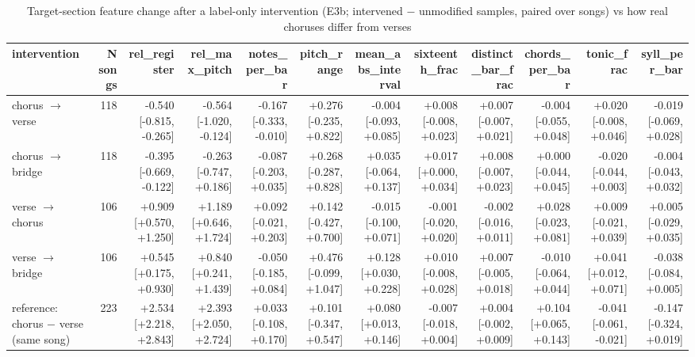 \begin{table}[t]
\centering
\small
\begin{tabular}{lrrrrrrrrrrr}
\toprule
intervention & N songs & rel\_register & rel\_max\_pitch & notes\_per\_bar & pitch\_range & mean\_abs\_interval & sixteenth\_frac & distinct\_bar\_frac & chords\_per\_bar & tonic\_frac & syll\_per\_bar \\
\midrule
chorus $\rightarrow$ verse & 118 & -0.540 [-0.815, -0.265] & -0.564 [-1.020, -0.124] & -0.167 [-0.333, -0.010] & +0.276 [-0.235, +0.822] & -0.004 [-0.093, +0.085] & +0.008 [-0.008, +0.023] & +0.007 [-0.007, +0.021] & -0.004 [-0.055, +0.048] & +0.020 [-0.008, +0.046] & -0.019 [-0.069, +0.028] \\
chorus $\rightarrow$ bridge & 118 & -0.395 [-0.669, -0.122] & -0.263 [-0.747, +0.186] & -0.087 [-0.203, +0.035] & +0.268 [-0.287, +0.828] & +0.035 [-0.064, +0.137] & +0.017 [+0.000, +0.034] & +0.008 [-0.007, +0.023] & +0.000 [-0.044, +0.045] & -0.020 [-0.044, +0.003] & -0.004 [-0.043, +0.032] \\
verse $\rightarrow$ chorus & 106 & +0.909 [+0.570, +1.250] & +1.189 [+0.646, +1.724] & +0.092 [-0.021, +0.203] & +0.142 [-0.427, +0.700] & -0.015 [-0.100, +0.071] & -0.001 [-0.020, +0.020] & -0.002 [-0.016, +0.011] & +0.028 [-0.023, +0.081] & +0.009 [-0.021, +0.039] & +0.005 [-0.029, +0.035] \\
verse $\rightarrow$ bridge & 106 & +0.545 [+0.175, +0.930] & +0.840 [+0.241, +1.439] & -0.050 [-0.185, +0.084] & +0.476 [-0.099, +1.047] & +0.128 [+0.030, +0.228] & +0.010 [-0.008, +0.028] & +0.007 [-0.005, +0.018] & -0.010 [-0.064, +0.044] & +0.041 [+0.012, +0.071] & -0.038 [-0.084, +0.005] \\
reference: chorus $-$ verse (same song) & 223 & +2.534 [+2.218, +2.843] & +2.393 [+2.050, +2.724] & +0.033 [-0.108, +0.170] & +0.101 [-0.347, +0.547] & +0.080 [+0.013, +0.146] & -0.007 [-0.018, +0.004] & +0.004 [-0.002, +0.009] & +0.104 [+0.065, +0.143] & -0.041 [-0.061, -0.021] & -0.147 [-0.324, +0.019] \\
\bottomrule
\end{tabular}
\caption{Target-section feature change after a label-only intervention (E3b; intervened $-$ unmodified samples, paired over songs) vs how real choruses differ from verses}
\label{tab:section_semantics_features}
\end{table}
